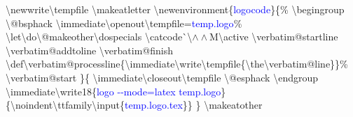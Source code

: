 \resetlinenumber
\begin{linenumbers}\singlespacing\ttfamily
\textbackslash newwrite\textbackslash tempf{}ile\newline
\textbackslash makeatletter\newline
\textbackslash newenvironment\{\textcolor{blue}{logocode}\}\{\%\newline
\hspace*{1.2em}\textbackslash begingroup\newline
\hspace*{1.2em}\textbackslash @bsphack\newline
\hspace*{1.2em}\textbackslash immediate\textbackslash openout\textbackslash tempf{}ile=\textcolor{blue}{temp.logo}\%\newline
\hspace*{1.2em}\textbackslash let\textbackslash do\textbackslash @makeother\textbackslash dospecials\newline
\hspace*{1.2em}\textbackslash catcode\`{}\textbackslash$\wedge\wedge$M\textbackslash active\newline
\hspace*{1.2em}\textbackslash verbatim@startline\newline
\hspace*{1.2em}\textbackslash verbatim@addtoline\newline
\hspace*{1.2em}\textbackslash verbatim@f{}inish\newline
\hspace*{1.2em}\textbackslash def\textbackslash verbatim@processline\{\textbackslash immediate\textbackslash write\textbackslash tempf{}ile\{\textbackslash the\textbackslash verbatim@line\}\}\%\newline
\hspace*{1.2em}\textbackslash verbatim@start\newline
\}\{\newline
\hspace*{1.2em}\textbackslash immediate\textbackslash closeout\textbackslash tempf{}ile\newline
\hspace*{1.2em}\textbackslash @esphack\newline
\hspace*{1.2em}\textbackslash endgroup\newline
\hspace*{1.2em}\textbackslash immediate\textbackslash write18\{\textcolor{blue}{logo -{}-mode=latex temp.logo}\}\newline
\hspace*{1.2em}\{\textbackslash noindent\textbackslash ttfamily\textbackslash input\{\textcolor{blue}{temp.logo.tex}\}\}\newline
\}\newline
\textbackslash makeatother
\end{linenumbers}

